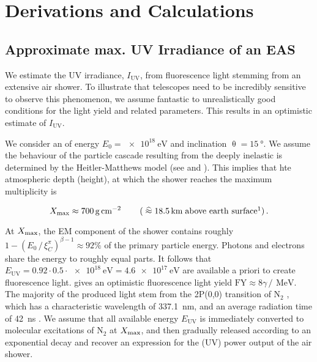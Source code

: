 
\chapter{Derivations and Calculations}
\label{app:derivation}


\section{Approximate max. UV Irradiance of an EAS}
\label{app:cr-uv-irradiance}

We estimate the UV irradiance, $I_\text{UV}$, from fluorescence light stemming 
from an extensive air shower. To illustrate that telescopes need to be 
incredibly sensitive to observe this phenomenon, we assume fantastic to 
unrealistically good conditions for the \UV light yield and related parameters. 
This results in an optimistic estimate of $I_\text{UV}$.

We consider an \EAS of energy $E_0 = \SI{e18}{\eV}$ and inclination 
$\uptheta=\SI{15}{\degree}$. We assume the behaviour of the particle cascade 
resulting from the deeply inelastic is determined by the Heitler-Matthews model 
(see  and \cite{matthewsHeitlerModelExtensive2005, 
rissePhotonAirShowers2006}). This implies that hte atmospheric depth (height), 
at which the shower reaches the maximum multiplicity is

\begin{equation}
\label{eq:irradiance-multiplicity}
\Xmax \approx \SI{700}{\gram\per\centi\meter\squared}\qquad\left(\;\widehat{\approx}\;\SI{18.5}{\kilo\meter}\;\text{above earth surface}\footnotemark\right).
\end{equation}

At $X_\mathrm{max}$, the EM component of the shower contains roughly
$1-\left(E_0\,/\,\xi^\pi_C\right)^{\beta-1}\approx92\%$ of the primary particle 
energy. Photons and electrons share the energy to roughly equal parts. It
follows that $E_\text{UV}=0.92\cdot0.5\cdot\SI{e18}{\electronvolt}=
\SI{4.6e17}{\electronvolt}$ are available a priori to create fluorescence light.
\cite{keilhauerNitrogenFluorescenceAir2013} gives an optimistic fluorescence 
light yield $\text{FY}\approx8\gamma\,/\,\SI{}{\mega\electronvolt}$. The 
majority of the produced light stem from the 2P(0,0) transition of N$_2$ 
\cite{aveSpectrallyResolvedPressure2008}, which has a characteristic wavelength 
of \SI{337.1}{\nano\meter}, and an average radiation time of 
\SI{42}{\nano\second} \cite{leanContributionUltravioletIrradiance1989}. We 
assume that all available energy $E_\text{UV}$ is immediately converted to 
molecular excitations of N$_2$ at $X_\mathrm{max}$, and then gradually released according
to an exponential decay and recover an expression for the (UV) power output of 
the air shower.

